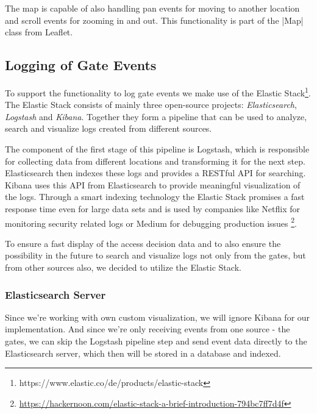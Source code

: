 The map is capable of also handling pan events for moving to another location and scroll events for zooming in and out. This functionality is part of the |Map| class from Leaflet.

\subsection{Logging of Gate Events}
\label{Logging of Gate Events}

To support the functionality to log gate events we make use of the Elastic Stack\footnote{https://www.elastic.co/de/products/elastic-stack}.
The Elastic Stack consists of mainly three open-source projects: \emph{Elasticsearch}, \emph{Logstash} and \emph{Kibana}.
Together they form a pipeline that can be used to analyze, search and visualize logs created from different sources. 

The component of the first stage of this pipeline is Logstash, which is responsible for collecting data from different locations and transforming it for the next step. Elasticsearch then indexes these logs and provides a RESTful API for searching. Kibana uses this API from Elasticsearch to provide meaningful visualization of the logs.
Through a smart indexing technology the Elastic Stack promises a fast response time even for large data sets and is used by companies like Netflix for monitoring security related logs or Medium for debugging production issues \footnote{\url{https://hackernoon.com/elastic-stack-a-brief-introduction-794bc7ff7d4f}}.

To ensure a fast display of the access decision data and to also ensure the possibility in the future to search and visualize logs not only from the gates, but from other sources also, we decided to utilize the Elastic Stack.

\subsubsection{Elasticsearch Server}

Since we're working with own custom visualization, we will ignore Kibana for our implementation. And since we're only receiving events from one source - the gates, we can skip the Logstash pipeline step and send event data directly to the Elasticsearch server, which then will be stored in a database and indexed.


